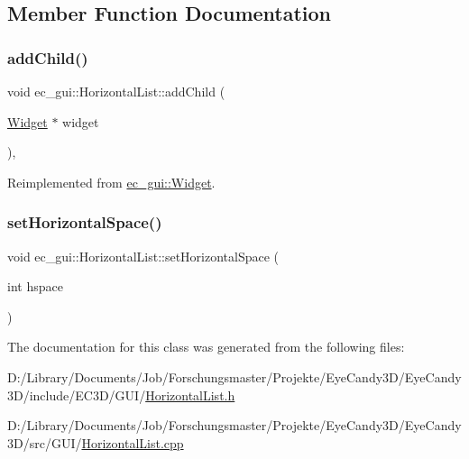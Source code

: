 \subsection{Member Function Documentation}
\mbox{\label{classec__gui_1_1_horizontal_list_a1617ae9942c10e9b277e222ce4d3484f}} 
\subsubsection{\texorpdfstring{add\+Child()}{addChild()}}
{\footnotesize\ttfamily void ec\+\_\+gui\+::\+Horizontal\+List\+::add\+Child (\begin{DoxyParamCaption}\item[{\mbox{\hyperlink{classec__gui_1_1_widget}{Widget}} $\ast$}]{widget }\end{DoxyParamCaption})\hspace{0.3cm}{\ttfamily [override]}, {\ttfamily [virtual]}}



Reimplemented from \mbox{\hyperlink{classec__gui_1_1_widget_a089877f93123b630011be58624c5d8cf}{ec\+\_\+gui\+::\+Widget}}.

\mbox{\label{classec__gui_1_1_horizontal_list_a1b09fd8142623f4c5c4e845867862bd3}} 
\subsubsection{\texorpdfstring{set\+Horizontal\+Space()}{setHorizontalSpace()}}
{\footnotesize\ttfamily void ec\+\_\+gui\+::\+Horizontal\+List\+::set\+Horizontal\+Space (\begin{DoxyParamCaption}\item[{int}]{hspace }\end{DoxyParamCaption})}



The documentation for this class was generated from the following files\+:\begin{DoxyCompactItemize}
\item 
D\+:/\+Library/\+Documents/\+Job/\+Forschungsmaster/\+Projekte/\+Eye\+Candy3\+D/\+Eye\+Candy3\+D/include/\+E\+C3\+D/\+G\+U\+I/\mbox{\hyperlink{_horizontal_list_8h}{Horizontal\+List.\+h}}\item 
D\+:/\+Library/\+Documents/\+Job/\+Forschungsmaster/\+Projekte/\+Eye\+Candy3\+D/\+Eye\+Candy3\+D/src/\+G\+U\+I/\mbox{\hyperlink{_horizontal_list_8cpp}{Horizontal\+List.\+cpp}}\end{DoxyCompactItemize}
